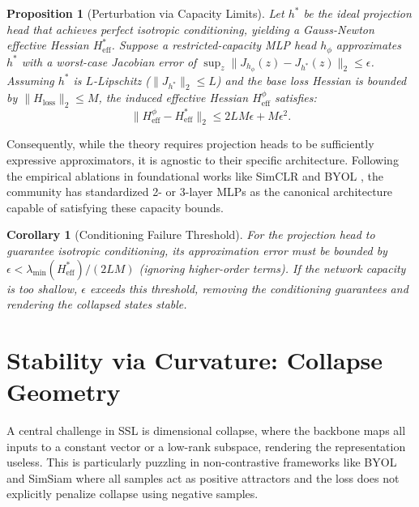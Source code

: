 \documentclass{article}
\theoremstyle{plain}
\newtheorem{proposition}[theorem]{Proposition}
\newtheorem{corollary}[theorem]{Corollary}
\theoremstyle{definition}
\theoremstyle{remark}
\begin{document}
\begin{proposition}[Perturbation via Capacity Limits]
\label{prop:capacity-limits}
Let $h^*$ be the ideal projection head that achieves perfect isotropic conditioning, yielding a Gauss-Newton effective Hessian $H_{\text{eff}}^*$. Suppose a restricted-capacity MLP head $h_\phi$ approximates $h^*$ with a worst-case Jacobian error of $\sup_{z} \|J_{h_\phi}(z) - J_{h^*}(z)\|_2 \le \epsilon$. Assuming $h^*$ is $L$-Lipschitz ($\|J_{h^*}\|_2 \le L$) and the base loss Hessian is bounded by $\| H_{\text{loss}} \|_2 \le M$, the induced effective Hessian $H_{\text{eff}}^\phi$ satisfies:
\begin{equation*}
    \| H_{\text{eff}}^\phi - H_{\text{eff}}^* \|_2 \le 2 L M \epsilon + M \epsilon^2.
\end{equation*}
\end{proposition}

Consequently, while the theory requires projection heads to be sufficiently expressive approximators, it is agnostic to their specific architecture. Following the empirical ablations in foundational works like SimCLR \citep{chen2020simclr, chen2020big} and BYOL \citep{grill2020byol}, the community has standardized 2- or 3-layer MLPs as the canonical architecture capable of satisfying these capacity bounds.

\begin{corollary}[Conditioning Failure Threshold]
\label{cor:failure-threshold}
For the projection head to guarantee isotropic conditioning, its approximation error must be bounded by $\epsilon < \lambda_{\min}(H_{\text{eff}}^*) / (2LM)$ (ignoring higher-order terms). If the network capacity is too shallow, $\epsilon$ exceeds this threshold, removing the conditioning guarantees and rendering the collapsed states stable.
\end{corollary}

\section{Stability via Curvature: Collapse Geometry}
\label{sec:stability}

A central challenge in SSL is dimensional collapse, where the backbone maps all inputs to a constant vector or a low-rank subspace, rendering the representation useless. This is particularly puzzling in non-contrastive frameworks like BYOL and SimSiam where all samples act as positive attractors and the loss does not explicitly penalize collapse using negative samples.
\end{document}
